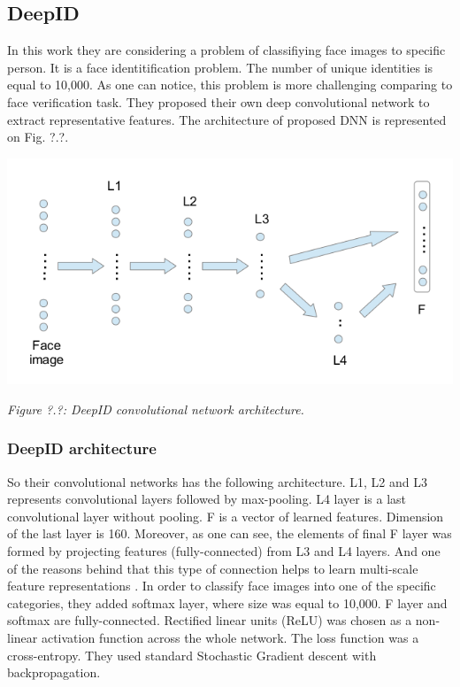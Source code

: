 \documentclass[paper=a4, fontsize=11pt]{scrartcl} %
\numberwithin{equation}{section} %
\numberwithin{figure}{section} %
\numberwithin{table}{section} %
\begin{document}
\subsection{DeepID}

In this work \cite{sun2014deepid} they are considering a problem of classifiying face images to specific person. It is a face identitification problem. The number of unique identities is equal to 10,000. As one can notice, this problem is more challenging comparing to face verification task. They proposed their own deep convolutional network to extract representative features. The architecture of proposed DNN is represented on Fig. ?.?.

\begin{center}
\includegraphics[scale=0.5]{pictures/deepid.png}
\par\large\textit{Figure ?.?: DeepID convolutional network architecture.}
\end{center}

\subsubsection{DeepID architecture}

So their convolutional networks has the following architecture. L1, L2 and L3 represents convolutional layers followed by max-pooling. L4 layer is a last convolutional layer without pooling. F is a vector of learned features. Dimension of the last layer is 160. Moreover, as one can see, the elements of final F layer was formed by projecting features (fully-connected) from L3 and L4 layers. And one of the reasons behind that this type of connection helps to learn multi-scale feature representations \cite{sermanet2011traffic}.  In order to classify face images into one of the specific categories, they added softmax layer, where size was equal to 10,000. F layer and softmax are fully-connected. Rectified linear units (ReLU) was chosen as a non-linear activation function across the whole network. The loss function was a cross-entropy. They used standard Stochastic Gradient descent with backpropagation.
\end{document}
